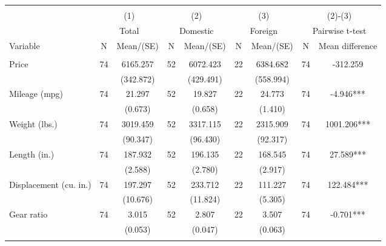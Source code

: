 
\begin{tabular}{@{\extracolsep{5pt}}p{200 pt}cccccccc}
\\[-1.8ex]\hline \hline \\[-1.8ex]
 & \multicolumn{2}{c}{(1)}  & \multicolumn{2}{c}{(2)}  & \multicolumn{2}{c}{(3)}  & \multicolumn{2}{c}{(2)-(3)} \\
 & \multicolumn{2}{c}{Total}  & \multicolumn{2}{c}{Domestic}  & \multicolumn{2}{c}{Foreign}  & \multicolumn{2}{c}{Pairwise t-test}  \\
Variable & N & Mean/(SE) & N & Mean/(SE) & N & Mean/(SE) & N & Mean difference \\ \hline \\[-1.8ex] 
Price   & 74    & 6165.257    & 52    & 6072.423    & 22    & 6384.682    & 74    & -312.259   \\
 &   & (342.872)  &   & (429.491)  &   & (558.994)  &   &  \\ [1ex]
Mileage (mpg)   & 74    & 21.297    & 52    & 19.827    & 22    & 24.773    & 74    & -4.946***   \\
 &   & (0.673)  &   & (0.658)  &   & (1.410)  &   &  \\ [1ex]
Weight (lbs.)   & 74    & 3019.459    & 52    & 3317.115    & 22    & 2315.909    & 74    & 1001.206***   \\
 &   & (90.347)  &   & (96.430)  &   & (92.317)  &   &  \\ [1ex]
Length (in.)   & 74    & 187.932    & 52    & 196.135    & 22    & 168.545    & 74    & 27.589***   \\
 &   & (2.588)  &   & (2.780)  &   & (2.917)  &   &  \\ [1ex]
Displacement (cu. in.)   & 74    & 197.297    & 52    & 233.712    & 22    & 111.227    & 74    & 122.484***   \\
 &   & (10.676)  &   & (11.824)  &   & (5.305)  &   &  \\ [1ex]
Gear ratio   & 74    & 3.015    & 52    & 2.807    & 22    & 3.507    & 74    & -0.701***   \\
 &   & (0.053)  &   & (0.047)  &   & (0.063)  &   &  \\ [1ex]
\hline \hline \\[-1.8ex]

\end{tabular}
